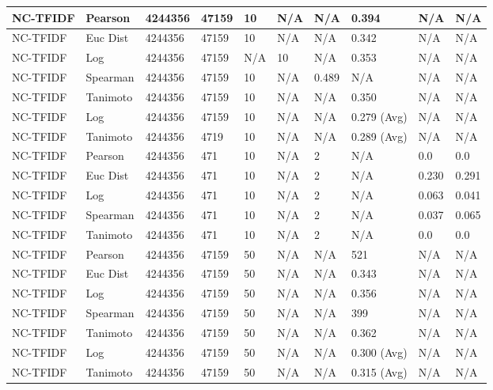 \documentclass{article}
\begin{document}
\begin{longtable}{ |p{1.7cm}|p{1.9cm}|p{1.5cm}|p{1.5cm}|p{0.75cm}|p{0.75cm}|p{0.75cm}|p{0.75cm}|p{1.5cm}|p{1.5cm}|}
    NC-TFIDF & Pearson & 4244356 & 47159 & 10 & N/A & N/A & 0.394 & N/A & N/A  \\ \hline
    NC-TFIDF  & Euc Dist & 4244356 & 47159 & 10 & N/A & N/A & 0.342 & N/A & N/A   \\ \hline
    NC-TFIDF  & Log & 4244356 & 47159  & N/A &  10 & N/A& 0.353 & N/A & N/A  \\ \hline
    NC-TFIDF  & Spearman & 4244356 & 47159  & 10 & N/A & 0.489 & N/A & N/A & N/A \\ \hline
    NC-TFIDF  & Tanimoto & 4244356 & 47159 & 10 & N/A& N/A & 0.350 & N/A & N/A \\ \hline
    NC-TFIDF  & Log & 4244356 & 47159 & 10 & N/A& N/A & 0.279 (Avg) & N/A & N/A \\ \hline
    NC-TFIDF  & Tanimoto & 4244356 & 4719 & 10 & N/A & N/A & 0.289 (Avg) & N/A & N/A \\ \hline
    
    NC-TFIDF  & Pearson & 4244356 & 471 & 10 & N/A  & 2 & N/A & 0.0 & 0.0  \\ \hline
    NC-TFIDF  & Euc Dist & 4244356 & 471 & 10 & N/A  & 2 & N/A & 0.230 & 0.291   \\ \hline
    NC-TFIDF  & Log & 4244356 & 471& 10 & N/A & 2 & N/A & 0.063 & 0.041  \\ \hline
    NC-TFIDF  & Spearman & 4244356 & 471 & 10 & N/A  & 2 & N/A &0.037 & 0.065 \\ \hline
    NC-TFIDF  & Tanimoto & 4244356 & 471 & 10 & N/A  & 2 & N/A & 0.0 & 0.0 \\ \hline
    
    NC-TFIDF & Pearson & 4244356 & 47159 & 50 & N/A & N/A & 521 & N/A & N/A  \\ \hline
    NC-TFIDF  & Euc Dist & 4244356 & 47159 & 50 & N/A & N/A & 0.343 & N/A & N/A   \\ \hline
    NC-TFIDF  & Log & 4244356 & 47159 &  50 & N/A & N/A & 0.356 & N/A & N/A  \\ \hline
    NC-TFIDF  & Spearman & 4244356 & 47159 & 50 & N/A & N/A & 399 & N/A & N/A \\ \hline
    NC-TFIDF  & Tanimoto & 4244356 & 47159 & 50 & N/A& N/A & 0.362 & N/A & N/A \\ \hline
    NC-TFIDF  & Log & 4244356 & 47159 & 50 & N/A& N/A & 0.300 (Avg) & N/A & N/A \\ \hline
    NC-TFIDF  & Tanimoto & 4244356 & 47159 & 50 & N/A & N/A & 0.315 (Avg) & N/A & N/A \\ \hline
    

\end{longtable}
\end{document}
